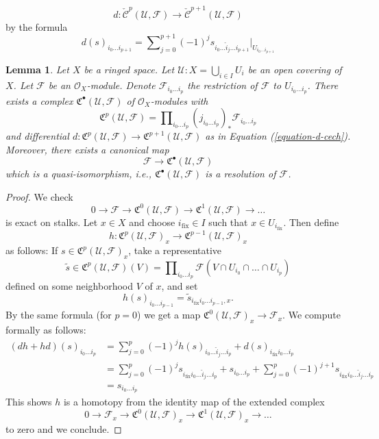 \documentclass[10pt,a4paper]{amsart}
\theoremstyle{plain}
\newtheorem{lemma}[subsection]{Lemma}
\theoremstyle{definition}
\theoremstyle{remark}
\numberwithin{equation}{subsection}
\begin{document}
$$
d : \check{\mathcal{C}}^p(\mathcal{U}, \mathcal{F})
\longrightarrow
\check{\mathcal{C}}^{p + 1}(\mathcal{U}, \mathcal{F})
$$
by the formula
\begin{equation}
\label{equation-d-cech}
d(s)_{i_0\ldots i_{p + 1}}
=
\sum\nolimits_{j = 0}^{p + 1}
(-1)^j
s_{i_0\ldots \hat i_j \ldots i_{p + 1}}|_{U_{i_0\ldots i_{p + 1}}}
\end{equation}

\begin{lemma}
\label{lemma-covering-resolution}
Let $X$ be a ringed space. Let $\mathcal{U} : X = \bigcup_{i \in I} U_i$
be an open covering of $X$. Let $\mathcal{F}$ be an $\mathcal{O}_X$-module.
Denote $\mathcal{F}_{i_0 \ldots i_p}$ the restriction of
$\mathcal{F}$ to $U_{i_0 \ldots i_p}$. There exists a complex
${\mathfrak C}^\bullet(\mathcal{U}, \mathcal{F})$
of $\mathcal{O}_X$-modules with
$$
{\mathfrak C}^p(\mathcal{U}, \mathcal{F}) =
\prod\nolimits_{i_0 \ldots i_p}
(j_{i_0 \ldots i_p})_* \mathcal{F}_{i_0 \ldots i_p}
$$
and differential
$d : {\mathfrak C}^p(\mathcal{U}, \mathcal{F})
\to {\mathfrak C}^{p + 1}(\mathcal{U}, \mathcal{F})$
as in Equation (\ref{equation-d-cech}). Moreover, there exists a canonical
map
$$
\mathcal{F} \to {\mathfrak C}^\bullet(\mathcal{U}, \mathcal{F})
$$
which is a quasi-isomorphism, i.e.,
${\mathfrak C}^\bullet(\mathcal{U}, \mathcal{F})$
is a resolution of $\mathcal{F}$.
\end{lemma}

\begin{proof}
We check
$$
0 \to \mathcal{F} \to \mathfrak{C}^0(\mathcal{U}, \mathcal{F}) \to
\mathfrak{C}^1(\mathcal{U}, \mathcal{F}) \to  \ldots
$$
is exact on stalks. Let $x \in X$ and choose $i_{\text{fix}} \in I$
such that $x \in U_{i_{\text{fix}}}$. Then define 
$$
h : \mathfrak{C}^p(\mathcal{U}, \mathcal{F})_x
\to \mathfrak{C}^{p - 1}(\mathcal{U}, \mathcal{F})_x
$$
as follows: If $s \in \mathfrak{C}^p(\mathcal{U}, \mathcal{F})_x$, take
a representative
$$
\widetilde{s} \in
\mathfrak{C}^p(\mathcal{U}, \mathcal{F})(V) =
\prod\nolimits_{i_0 \ldots i_p}
\mathcal{F}(V \cap U_{i_0} \cap \ldots \cap U_{i_p})
$$
defined on some neighborhood $V$ of $x$, and set
$$
h(s)_{i_0 \ldots i_{p - 1}} =
\widetilde{s}_{i_{\text{fix}} i_0 \ldots i_{p - 1}, x}.
$$
By the same formula (for $p = 0$) we get a map
$\mathfrak{C}^{0}(\mathcal{U},\mathcal{F})_x \to \mathcal{F}_x$.
We compute formally as follows:
\begin{align*}
(dh + hd)(s)_{i_0 \ldots i_p}
& =
\sum\nolimits_{j = 0}^p
(-1)^j
h(s)_{i_0 \ldots \hat i_j \ldots i_p}
+
d(s)_{i_{\text{fix}} i_0 \ldots i_p}\\
& =
\sum\nolimits_{j = 0}^p
(-1)^j
s_{i_{\text{fix}} i_0 \ldots \hat i_j \ldots i_p}
+
s_{i_0 \ldots i_p}
+
\sum\nolimits_{j = 0}^p
(-1)^{j + 1}
s_{i_{\text{fix}} i_0 \ldots \hat i_j \ldots i_p} \\
& =
s_{i_0 \ldots i_p}
\end{align*}
This shows $h$ is a homotopy from the identity map of
the extended complex
$$
0 \to \mathcal{F}_x \to \mathfrak{C}^0(\mathcal{U}, \mathcal{F})_x
\to \mathfrak{C}^1(\mathcal{U}, \mathcal{F})_x \to \ldots
$$
to zero and we conclude.
\end{proof}
\end{document}
